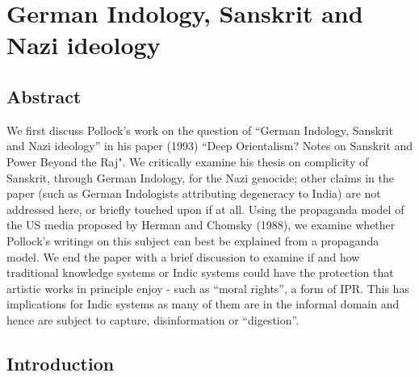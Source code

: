 \chapter{German Indology, Sanskrit and Nazi ideology}\label{chapter1}
\vskip -10pt

\vskip -10pt

\section*{Abstract}

We first discuss Pollock’s work on the question of “German Indology, Sanskrit and Nazi ideology” in his paper (1993) ``Deep Orientalism? Notes on Sanskrit and Power Beyond the Raj". We critically examine his thesis on complicity of Sanskrit, through German Indology, for the Nazi genocide; other claims in the paper (such as German Indologists attributing degeneracy to India) are not addressed here, or briefly touched upon if at all. Using the propaganda model of the US media proposed by Herman and Chomsky (1988), we examine whether Pollock’s writings on this subject can best be explained from a propaganda model.  We end the paper with a brief discussion to examine if and how traditional knowledge systems or Indic systems could have the protection that artistic works in principle enjoy - such as ``moral rights”, a form of IPR. This has implications for Indic systems as many of them are in the informal domain and hence are subject to capture, disinformation or “digestion”.

\vskip -10pt


\section*{Introduction}

